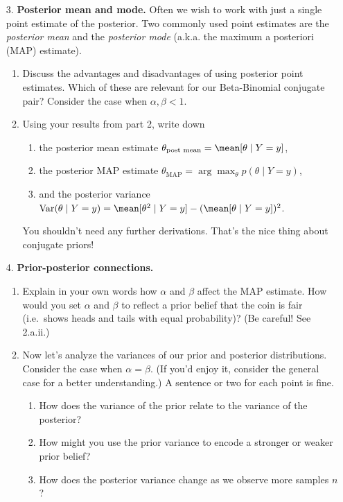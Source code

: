 \documentclass[submit]{harvardml}
\begin{document}
\begin{framed}
\begin{enumerate}
  \item[3.]
    \textbf{Posterior mean and mode.} Often we wish to work with just a
    single point estimate of the posterior. Two commonly used point
    estimates are the \emph{posterior mean} and the \emph{posterior mode}
    (a.k.a. the maximum a posteriori (MAP) estimate).
  
    \begin{enumerate}
    \item
      Discuss the advantages and disadvantages of using posterior point
      estimates. Which of these are relevant for our Beta-Binomial conjugate pair? Consider the case when $\alpha, \beta < 1$.
    
    \item
      Using your results from part 2, write down
      
      \begin{enumerate}
        \item the posterior mean estimate \(\theta_{\text{post mean}} = \mean [\theta \mid Y = y]\),
        \item the posterior MAP estimate \(\theta_{\text{MAP}}=\arg \max_{\theta}p(\theta \mid Y=y)\),
        \item and the posterior variance $\mathrm{Var}(\theta \mid Y = y) = \mean[\theta^2 \mid Y = y] - (\mean[\theta \mid Y = y])^2$.
      \end{enumerate}
      
      You shouldn't need any further derivations. That's the nice thing about conjugate priors!
      
    \end{enumerate}

\item[4.]
    \textbf{Prior-posterior connections.}

    \begin{enumerate}
    \item
      Explain in your own words how \(\alpha\) and \(\beta\) affect the
      MAP estimate. How would you set \(\alpha\) and \(\beta\) to reflect
      a prior belief that the coin is fair (i.e.~shows heads and tails
      with equal probability)? (Be careful! See 2.a.ii.)

    \item Now let's analyze the variances of our prior and posterior distributions. Consider the case when $\alpha = \beta$. (If you'd enjoy it, consider the general case for a better understanding.) A sentence or two for each point is fine.
    \begin{enumerate}
      \item How does the variance of the prior relate to the variance of the posterior?
      \item How might you use the prior variance to encode a stronger or weaker prior belief?
      \item How does the posterior variance change as we observe more samples $n$?
    \end{enumerate}
    \end{enumerate}


\end{enumerate}
\end{framed}
\end{document}
